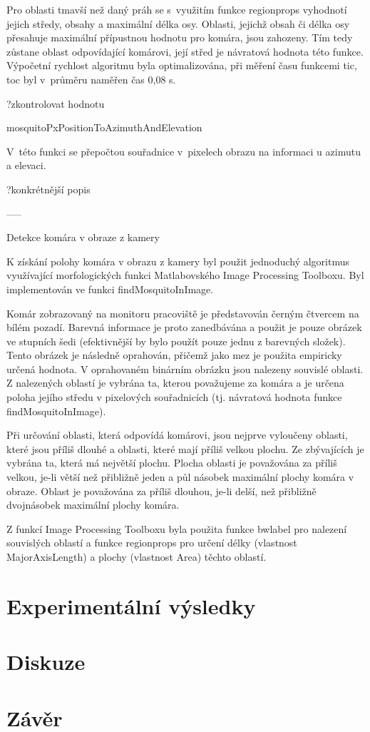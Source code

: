 \documentclass[a4paper,10pt]{article}
\begin{document}
Pro oblasti tmavší než daný práh se s využitím funkce regionprops vyhodnotí jejich středy, obsahy a maximální délka osy. Oblasti, jejichž obsah či délka osy přesahuje maximální přípustnou hodnotu pro komára, jsou zahozeny. Tím tedy zůstane oblast odpovídající komárovi, její střed je návratová hodnota této funkce. Výpočetní rychlost algoritmu byla optimalizována, při měření času funkcemi tic, toc byl v průměru naměřen čas 0,08 s.

?zkontrolovat hodnotu

mosquitoPxPositionToAzimuthAndElevation

V této funkci se přepočtou souřadnice v pixelech obrazu na informaci u azimutu a elevaci.

?konkrétnější popis

-----

Detekce komára v obraze z kamery

K získání polohy komára v obrazu z kamery byl použit jednoduchý algoritmus využívající morfologických funkci Matlabovského Image Processing Toolboxu. Byl implementován ve funkci findMosquitoInImage.

Komár zobrazovaný na monitoru pracoviště je představován černým čtvercem na bílém pozadí. Barevná informace je proto zanedbávána a použit je pouze obrázek ve stupních šedi (efektivnější by bylo použít pouze jednu z barevných složek). Tento obrázek je následně oprahován, přičemž jako mez je použita empiricky určená hodnota. V oprahovaném binárním obrázku jsou nalezeny souvislé oblasti. Z nalezených oblastí je vybrána ta, kterou považujeme za komára a je určena poloha jejího středu v pixelových souřadnicích (tj. návratová hodnota funkce findMosquitoInImage).

Při určování oblasti, která odpovídá komárovi, jsou nejprve vyloučeny oblasti, které jsou příliš dlouhé a oblasti, které mají příliš velkou plochu. Ze zbývajících je vybrána ta, která má největší plochu. Plocha oblasti je považována za příliš velkou, je-li větší než přibližně jeden a půl násobek maximální plochy komára v obraze. Oblast je považována za příliš dlouhou, je-li delší, než přibližně dvojnásobek maximální plochy komára.

Z funkcí Image Processing Toolboxu byla použita funkce bwlabel pro nalezení souvislých oblastí a funkce regionprops pro určení délky (vlastnost MajorAxisLength) a plochy (vlastnost Area) těchto oblastí.


\section{Experimentální výsledky}
\section{Diskuze}
\section{Závěr}
\end{document}
